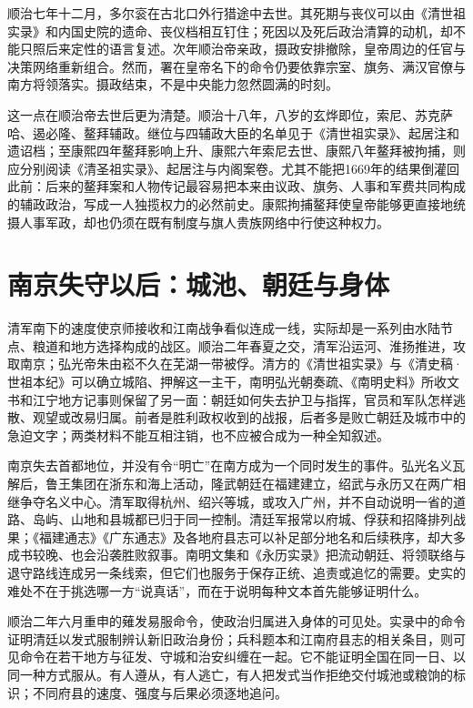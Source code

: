顺治七年十二月，多尔衮在古北口外行猎途中去世。其死期与丧仪可以由《清世祖实录》和内国史院的遗命、丧仪档相互钉住；死因以及死后政治清算的动机，却不能只照后来定性的语言复述。次年顺治帝亲政，摄政安排撤除，皇帝周边的任官与决策网络重新组合。然而，署在皇帝名下的命令仍要依靠宗室、旗务、满汉官僚与南方将领落实。摄政结束，不是中央能力忽然圆满的时刻。

这一点在顺治帝去世后更为清楚。顺治十八年，八岁的玄烨即位，索尼、苏克萨哈、遏必隆、鳌拜辅政。继位与四辅政大臣的名单见于《清世祖实录》、起居注和遗诏档；至康熙四年鳌拜影响上升、康熙六年索尼去世、康熙八年鳌拜被拘捕，则应分别阅读《清圣祖实录》、起居注与内阁案卷。尤其不能把1669年的结果倒灌回此前：后来的鳌拜案和人物传记最容易把本来由议政、旗务、人事和军费共同构成的辅政政治，写成一人独揽权力的必然前史。康熙拘捕鳌拜使皇帝能够更直接地统摄人事军政，却也仍须在既有制度与旗人贵族网络中行使这种权力。

\section{南京失守以后：城池、朝廷与身体}

清军南下的速度使京师接收和江南战争看似连成一线，实际却是一系列由水陆节点、粮道和地方选择构成的战区。顺治二年春夏之交，清军沿运河、淮扬推进，攻取南京；弘光帝朱由崧不久在芜湖一带被俘。清方的《清世祖实录》与《清史稿·世祖本纪》可以确立城陷、押解这一主干，南明弘光朝奏疏、《南明史料》所收文书和江宁地方记事则保留了另一面：朝廷如何失去护卫与指挥，官员和军队怎样逃散、观望或改易归属。前者是胜利政权收到的战报，后者多是败亡朝廷及城市中的急迫文字；两类材料不能互相注销，也不应被合成为一种全知叙述。

南京失去首都地位，并没有令“明亡”在南方成为一个同时发生的事件。弘光名义瓦解后，鲁王集团在浙东和海上活动，隆武朝廷在福建建立，绍武与永历又在两广相继争夺名义中心。清军取得杭州、绍兴等城，或攻入广州，并不自动说明一省的道路、岛屿、山地和县城都已归于同一控制。清廷军报常以府城、俘获和招降排列战果；《福建通志》《广东通志》及各地府县志可以补足部分地名和后续秩序，却大多成书较晚、也会沿袭胜败叙事。南明文集和《永历实录》把流动朝廷、将领联络与退守路线连成另一条线索，但它们也服务于保存正统、追责或追忆的需要。史实的难处不在于挑选哪一方“说真话”，而在于说明每种文本首先能够证明什么。

顺治二年六月重申的薙发易服命令，使政治归属进入身体的可见处。实录中的命令证明清廷以发式服制辨认新旧政治身份；兵科题本和江南府县志的相关条目，则可见命令在若干地方与征发、守城和治安纠缠在一起。它不能证明全国在同一日、以同一种方式服从。有人遵从，有人逃亡，有人把发式当作拒绝交付城池或粮饷的标识；不同府县的速度、强度与后果必须逐地追问。

